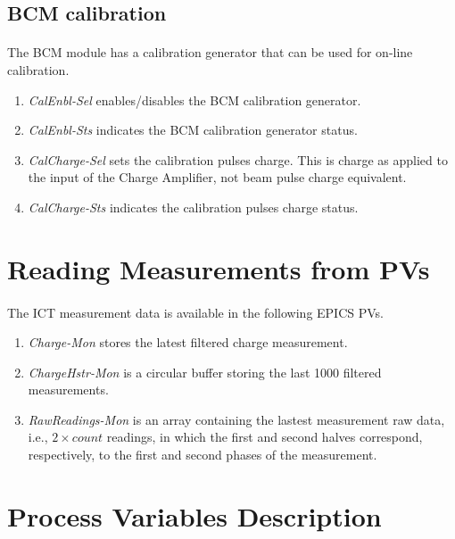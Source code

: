 \documentclass[openany]{article}
\begin{document}
	\subsection{BCM calibration}

		\paragraph{} The BCM module has a calibration generator that can be used for on-line calibration.

			\begin{enumerate}
			\item \emph{CalEnbl-Sel} enables/disables the BCM calibration generator.
			\item \emph{CalEnbl-Sts} indicates the BCM calibration generator status.
			\item \emph{CalCharge-Sel} sets the calibration pulses charge. This is charge as applied to the input of the Charge Amplifier, not beam pulse charge equivalent.
			\item \emph{CalCharge-Sts} indicates the calibration pulses charge status.
			\end{enumerate}

\section{Reading Measurements from PVs}

	\paragraph{} The ICT measurement data is available in the following EPICS PVs.

		\begin{enumerate}
		\item \emph{Charge-Mon} stores the latest filtered charge measurement.
		\item \emph{ChargeHstr-Mon} is a circular buffer storing the last 1000 filtered measurements.
		\item \emph{RawReadings-Mon} is an array containing the lastest measurement raw data, i.e., $ 2 \times count $ readings, in which the first and second halves correspond, respectively, to the first and second phases of the measurement.
		\end{enumerate}

\section{Process Variables Description}\label{sec:process-variables}
\end{document}
